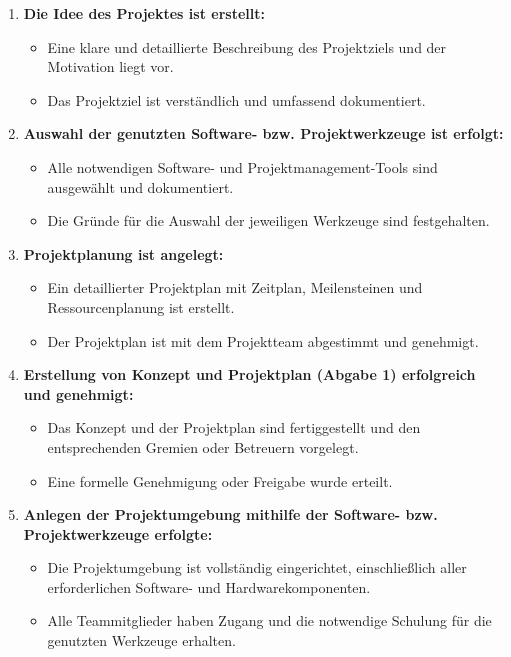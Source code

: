 \begin{enumerate}
\item \textbf{Die Idee des Projektes ist erstellt:}
\begin{itemize}[label=--, itemsep=0pt, parsep=0pt]
\item Eine klare und detaillierte Beschreibung des Projektziels und der Motivation liegt vor.
\item Das Projektziel ist verständlich und umfassend dokumentiert.
\end{itemize}

\item \textbf{Auswahl der genutzten Software- bzw. Projektwerkzeuge ist erfolgt:}
\begin{itemize}[label=--, itemsep=0pt, parsep=0pt]
\item Alle notwendigen Software- und Projektmanagement-Tools sind ausgewählt und dokumentiert.
\item Die Gründe für die Auswahl der jeweiligen Werkzeuge sind festgehalten.
\end{itemize}

\item \textbf{Projektplanung ist angelegt:}
\begin{itemize}[label=--, itemsep=0pt, parsep=0pt]
\item Ein detaillierter Projektplan mit Zeitplan, Meilensteinen und Ressourcenplanung ist erstellt.
\item Der Projektplan ist mit dem Projektteam abgestimmt und genehmigt.
\end{itemize}

\item \textbf{Erstellung von Konzept und Projektplan (Abgabe 1) erfolgreich und genehmigt:}
\begin{itemize}[label=--, itemsep=0pt, parsep=0pt]
\item Das Konzept und der Projektplan sind fertiggestellt und den entsprechenden Gremien oder Betreuern vorgelegt.
\item Eine formelle Genehmigung oder Freigabe wurde erteilt.
\end{itemize}

\item \textbf{Anlegen der Projektumgebung mithilfe der Software- bzw. Projektwerkzeuge erfolgte:}
\begin{itemize}[label=--, itemsep=0pt, parsep=0pt]
\item Die Projektumgebung ist vollständig eingerichtet, einschließlich aller erforderlichen Software- und Hardwarekomponenten.
\item Alle Teammitglieder haben Zugang und die notwendige Schulung für die genutzten Werkzeuge erhalten.
\end{itemize}


\end{enumerate}
